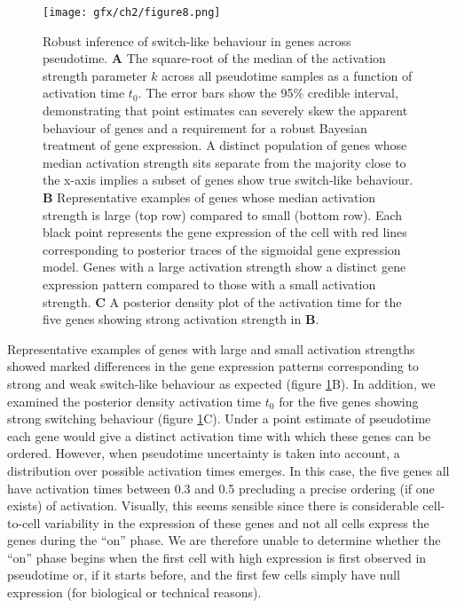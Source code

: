 \begin{figure}
\centering
	\texttt{[image: gfx/ch2/figure8.png]}
\caption[Robust inference of switch-like behaviour in genes across pseudotime.]{ Robust inference of switch-like behaviour in genes across pseudotime.
\textbf{A} The square-root of the median of the activation strength parameter $k$ across all pseudotime samples as a function of activation time $t_0$. The error bars show the 95\% credible interval, demonstrating that point estimates can severely skew the apparent behaviour of genes and a requirement for a robust Bayesian treatment of gene expression. A distinct population of genes whose median activation strength sits separate from the majority close to the x-axis implies a subset of genes show true switch-like behaviour. \textbf{B} Representative examples of genes whose median activation strength is large (top row) compared to small (bottom row). Each black point represents the gene expression of the cell with red lines corresponding to posterior traces of the sigmoidal gene expression model. Genes with a large activation strength show a distinct gene expression pattern compared to those with a small activation strength. \textbf{C} A posterior density plot of the activation time for the five genes showing strong activation strength in \textbf{B}.} \label{fig:switchres}
\end{figure}

Representative examples of genes with large and small activation strengths showed marked differences in the gene expression patterns corresponding  to strong and weak switch-like behaviour as expected (figure \ref{fig:switchres}B). In addition, we examined the posterior density activation time $t_0$ for the five genes showing strong switching behaviour (figure \ref{fig:switchres}C). Under a point estimate of pseudotime each gene would give a distinct activation time with which these genes can be ordered. However, when pseudotime uncertainty is taken into account, a distribution over possible activation times emerges. In this case, the five genes all have activation times between 0.3 and 0.5 precluding a precise ordering (if one exists) of activation. Visually, this seems sensible since there is considerable cell-to-cell variability in the expression of these genes and not all cells express the genes during the ``on'' phase. We are therefore unable to determine whether the ``on'' phase begins when the first cell with high expression is first observed in pseudotime or, if it starts before, and the first few cells simply have null expression (for biological or technical reasons).

